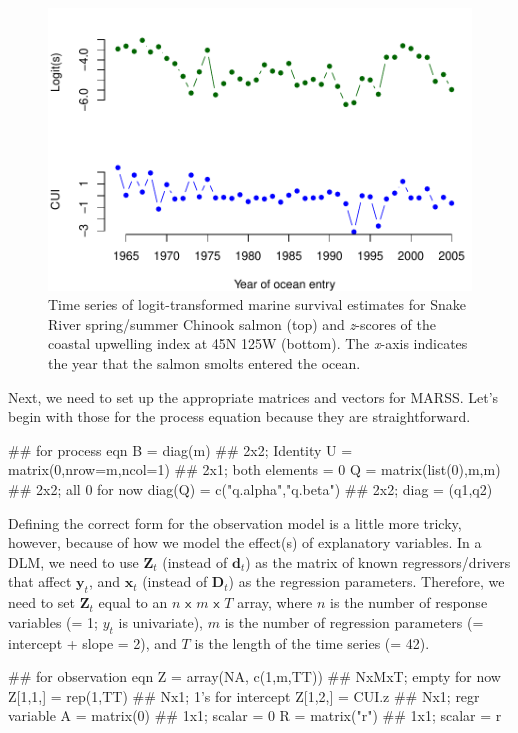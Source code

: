 \documentclass[10pt]{article}
\def\DD{\mbox{$\mathbf D$}}
\def\dd{\mbox{$\mathbf d$}}
\def\xx{\mbox{$\mathbf x$}}
\def\yy{\mbox{$\mathbf y$}}
\def\ZZ{\mbox{$\mathbf Z$}}
\begin{document}
\begin{figure}[htp]
\begin{center}
\includegraphics{DLM_lab_5-plotdata}
\end{center}
\caption{Time series of logit-transformed marine survival estimates for Snake River spring/summer Chinook salmon (top) and \textit{z}-scores of the coastal upwelling index at 45N 125W (bottom). The \textit{x}-axis indicates the year that the salmon smolts entered the ocean.}
\label{fig:CSX.fig1}
\end{figure}

Next, we need to set up the appropriate matrices and vectors for MARSS. Let's begin with those for the process equation because they are straightforward.
\begin{Schunk}
\begin{Sinput}
 ## for process eqn
 B = diag(m)                     ## 2x2; Identity
 U = matrix(0,nrow=m,ncol=1)     ## 2x1; both elements = 0
 Q = matrix(list(0),m,m)         ## 2x2; all 0 for now
 diag(Q) = c("q.alpha","q.beta") ## 2x2; diag = (q1,q2)
\end{Sinput}
\end{Schunk}

Defining the correct form for the observation model is a little more tricky, however, because of how we model the effect(s) of explanatory variables. In a DLM, we need to use $\ZZ_t$ (instead of $\dd_t$) as the matrix of known regressors/drivers that affect $\yy_t$, and $\xx_t$ (instead of $\DD_t$) as the regression parameters. Therefore, we need to set $\ZZ_t$ equal to an $n$ $\mathsf{x}$ $m$ $\mathsf{x}$ $T$ array, where $n$ is the number of response variables (= 1; $y_t$ is univariate), $m$ is the number of regression parameters (= intercept + slope = 2), and $T$ is the length of the time series (= 42). 
\begin{Schunk}
\begin{Sinput}
 ## for observation eqn
 Z = array(NA, c(1,m,TT))   ## NxMxT; empty for now
 Z[1,1,] = rep(1,TT)        ## Nx1; 1's for intercept
 Z[1,2,] = CUI.z            ## Nx1; regr variable
 A = matrix(0)              ## 1x1; scalar = 0
 R = matrix("r")            ## 1x1; scalar = r
\end{Sinput}
\end{Schunk}
\end{document}
